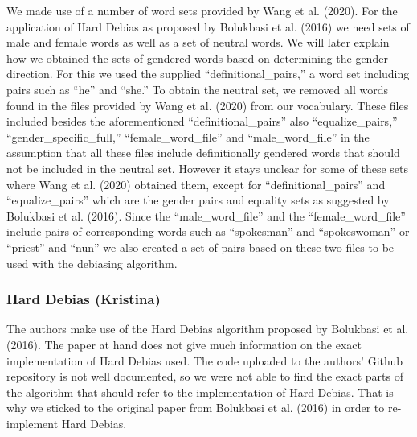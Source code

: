 \documentclass[
  english,
  man,floatsintext]{apa6}
\begin{document}
We made use of a number of word sets provided by Wang et al. (2020). For the application of Hard Debias as proposed by Bolukbasi et al. (2016) we need sets of male and female words as well as a set of neutral words. We will later explain how we obtained the sets of gendered words based on determining the gender direction. For this we used the supplied ``definitional\_pairs,'' a word set including pairs such as ``he'' and ``she.'' To obtain the neutral set, we removed all words found in the files provided by Wang et al. (2020) from our vocabulary. These files included besides the aforementioned ``definitional\_pairs'' also ``equalize\_pairs,'' ``gender\_specific\_full,'' ``female\_word\_file'' and ``male\_word\_file'' in the assumption that all these files include definitionally gendered words that should not be included in the neutral set. However it stays unclear for some of these sets where Wang et al. (2020) obtained them, except for ``definitional\_pairs'' and ``equalize\_pairs'' which are the gender pairs and equality sets as suggested by Bolukbasi et al. (2016). Since the ``male\_word\_file'' and the ``female\_word\_file'' include pairs of corresponding words such as ``spokesman'' and ``spokeswoman'' or ``priest'' and ``nun'' we also created a set of pairs based on these two files to be used with the debiasing algorithm.

\hypertarget{hard-debias-kristina}{%
\subsubsection{Hard Debias (Kristina)}\label{hard-debias-kristina}}

The authors make use of the Hard Debias algorithm proposed by Bolukbasi et al. (2016). The paper at hand does not give much information on the exact implementation of Hard Debias used. The code uploaded to the authors' Github repository is not well documented, so we were not able to find the exact parts of the algorithm that should refer to the implementation of Hard Debias. That is why we sticked to the original paper from Bolukbasi et al. (2016) in order to re-implement Hard Debias.
\end{document}
